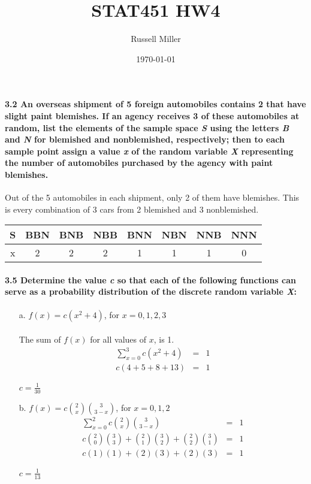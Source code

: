 \documentclass{article}
\title{STAT451 HW4}
\author{Russell Miller}
\date{\today}
\begin{document}
\maketitle


\paragraph{3.2 An overseas shipment of 5 foreign automobiles contains 2 that 
have slight paint blemishes. If an agency receives 3 of these automobiles at 
random, list the elements of the sample space \emph{S} using the letters \emph{B} 
and \emph{N} for blemished and nonblemished, respectively; then to each 
sample point assign a value \emph{x} of the random variable \emph{X} 
representing the number of automobiles purchased by the agency with paint 
blemishes.\\}
Out of the 5 automobiles in each shipment, only 2 of them have blemishes.
This is every combination of 3 cars from 2 blemished and 3 nonblemished.
\begin{center}
\begin{tabular}{c|c c c c c c c}
S & BBN & BNB & NBB & BNN & NBN & NNB & NNN\\
\hline
x &  2  &  2  &  2  &  1  &  1  &  1  &  0
\end{tabular}
\end{center}

\paragraph{3.5 Determine the value \emph{c} so that each of the following 
functions can serve as a probability distribution of the discrete random 
variable \emph{X}:}
\begin{enumerate}
\item[a.] $f(x) = c(x^2 + 4)$, for $x = 0,1,2,3$\\
\\
The sum of $f(x)$ for all values of $x$, is 1.
\begin{eqnarray*}
  \sum\limits_{x=0}^3 c(x^2 + 4)  & = & 1\\
   c(4+5+8+13) & = & 1
\end{eqnarray*}
\begin{center}
$\boxed{c = \frac{1}{30}}$
\end{center}

\item[b.] $f(x) = c{2 \choose x}{3 \choose 3-x}$, for $x = 0,1,2$\\
\begin{eqnarray*}
  \sum\limits_{x=0}^2 c{2 \choose x}{3 \choose 3-x} & = & 1\\
  c{2 \choose 0}{3 \choose 3}+{2 \choose 1}{3 \choose 2}+
   {2 \choose 2}{3 \choose 1} & = & 1\\
  c(1)(1)+(2)(3)+(2)(3) & = & 1
\end{eqnarray*}
\begin{center}
$\boxed{c=\frac{1}{13}}$
\end{center}
\end{enumerate}
\end{document}
